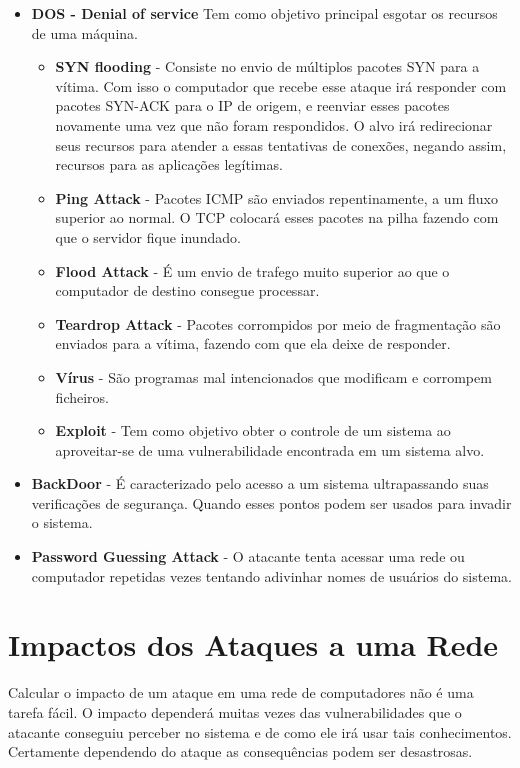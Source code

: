 		\begin{itemize}
			\item  \textbf{DOS - Denial of service} Tem  como objetivo principal esgotar os recursos de uma máquina.
				\begin{itemize}
					\item \textbf{SYN flooding} - Consiste no envio de múltiplos pacotes SYN para a vítima. Com isso o computador que recebe esse ataque irá responder com pacotes SYN-ACK para o IP de origem, e reenviar esses pacotes novamente uma vez que não foram respondidos. O alvo irá redirecionar seus recursos para atender a essas tentativas de conexões, negando assim, recursos para as aplicações legítimas.  
					\item \textbf{Ping Attack} - Pacotes ICMP são enviados repentinamente, a um fluxo superior ao normal. O TCP colocará esses pacotes na pilha fazendo com que o servidor fique inundado.
					\item \textbf{Flood Attack} - É um envio de trafego muito superior ao que o computador de destino consegue processar.
					\item \textbf{Teardrop Attack} - Pacotes corrompidos por meio de fragmentação são enviados para a vítima, fazendo com que ela deixe de responder.
					\item \textbf{Vírus} - São programas mal intencionados que modificam e corrompem ficheiros.
					\item \textbf{Exploit} - Tem como objetivo obter o controle de um sistema ao aproveitar-se de uma vulnerabilidade encontrada em um sistema alvo.
				\end{itemize}

			\item \textbf{BackDoor} - É caracterizado pelo acesso a um sistema ultrapassando suas verificações de segurança. Quando esses pontos podem ser usados para invadir o sistema.
			\item \textbf{Password Guessing Attack} - O atacante tenta acessar uma rede ou computador repetidas vezes tentando adivinhar nomes de usuários do sistema.
		\end{itemize}


	\section{Impactos dos Ataques a uma Rede}
	\label{sec:Seguranca_Impactos}

		Calcular o impacto de um ataque em uma rede de computadores não é uma tarefa fácil. O impacto dependerá muitas vezes das vulnerabilidades que o atacante conseguiu perceber no sistema e de como ele irá usar tais conhecimentos\cite{cyberAttacks}. Certamente dependendo do ataque as consequências podem ser desastrosas. 

